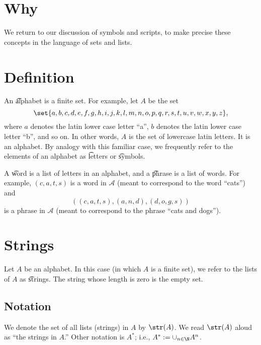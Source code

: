
\section*{Why}

We return to our discussion of symbols and scripts, to make precise these concepts in the language of sets and lists.

\section*{Definition}

An \t{alphabet} is a finite set.
For example, let $A$ be the set
\[
\set{a, b, c, d, e, f,g,h,i,j,k,l,m,n,o,p,q,r,s,t,u,v,w, x, y,z},
\]
where $a$ denotes the latin lower case letter ``a'', $b$ denotes the latin lower case letter ``b'', and so on.
In other words, $A$ is the set of lowercase latin letters.
It is an alphabet.
By analogy with this familiar case, we frequently refer to the elements of an alphabet as \t{letters} or \t{symbols}.

A \t{word} is a list of letters in an alphabet, and a \t{phrase} is a list of words.
For example, $(c,a,t,s)$ is a word in $\mathcal{A} $ (meant to correspond to the word ``cats'') and
\[
((c,a,t,s), (a,n,d), (d,o,g,s))
\]
is a phrase in $\mathcal{A} $ (meant to correspond to the phrase ``cats and dogs'').

\section*{Strings}

Let $A$ be an alphabet.
In this case (in which $A$ is a finite set), we refer to the lists of $A$ as \t{strings}.
The string whose length is zero is the empty set.

\subsection*{Notation}

We denote the set of all lists (strings) in $A$ by $\str(A)$.
We read $\str(A)$ aloud as ``the strings in $A$.''
Other notation is $A^*$; i.e., $A^* := \cup_{n \in \N  } A^n$.
